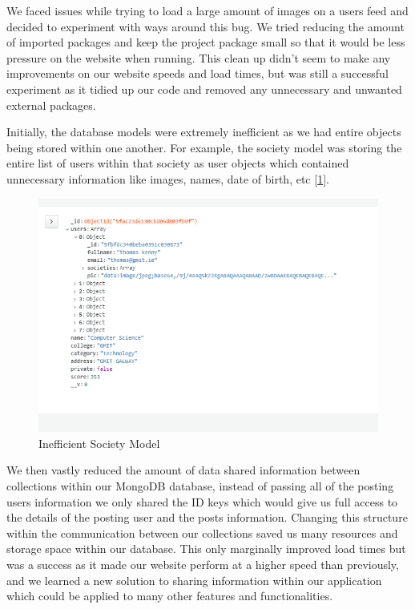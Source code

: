 We faced issues while trying to load a large amount of images on a users feed and decided to experiment with ways around this bug. We tried reducing the amount of imported packages and keep the project package small so that it would be less pressure on the website when running. This clean up didn't seem to make any improvements on our website speeds and load times, but was still a successful experiment as it tidied up our code and removed any unnecessary and unwanted external packages.
\newline

Initially, the database models were extremely inefficient as we had entire objects being stored within one another. For example, the society model was storing the entire list of users within that society as user objects which contained unnecessary information like images, names, date of birth, etc [\ref{fig:inefficient_society_model}].

\begin{figure}[H]
    \centering
    \includegraphics[scale=0.8]{img/bad_society_model_1.jpg}
    \caption{Inefficient Society Model}
    \label{fig:inefficient_society_model}
\end{figure}

We then vastly reduced the amount of data shared information between collections within our MongoDB database, instead of passing all of the posting users information we only shared the ID keys which would give us full access to the details of the posting user and the posts information.
Changing this structure within the communication between our collections saved us many resources and storage space within our database. This only marginally improved load times but was a success as it made our website perform at a higher speed than previously, and we learned a new solution to sharing information within our application which could be applied to many other features and functionalities.
\newline

